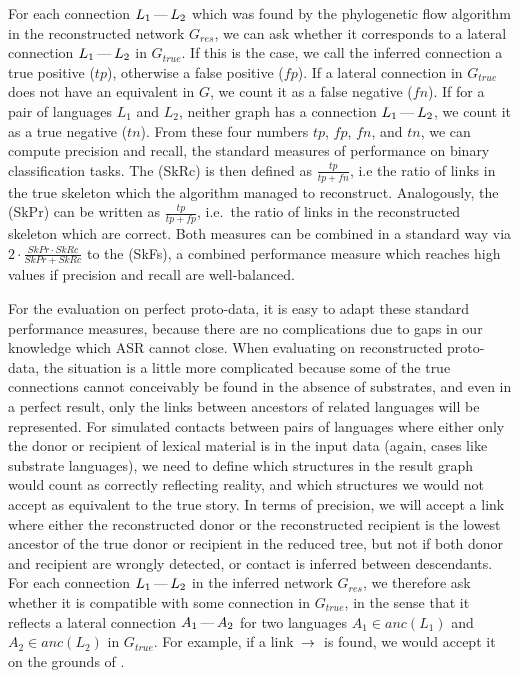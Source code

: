 For each connection $L_1 \kern 2pt\hbox{---}\kern 2pt L_2$ which was found by the phylogenetic flow algorithm in the reconstructed network $G_{res}$, we can ask whether it corresponds to a lateral connection $L_1 \kern 2pt\hbox{---}\kern 2pt L_2$ in $G_{true}$. If this is the case, we call the inferred connection a true positive ($tp$), otherwise a false positive ($fp$). If a lateral connection in $G_{true}$ does not have an equivalent in $G$, we count it as a false negative ($fn$). If for a pair of languages $L_1$ and $L_2$, neither graph has a connection $L_1 \kern 2pt\hbox{---}\kern 2pt L_2$, we count it as a true negative ($tn$). From these four numbers $tp$, $fp$, $fn$, and $tn$, we can compute precision and recall, the standard measures of performance on binary classification tasks. The \textit{} (SkRc) is then defined as $\frac{tp}{tp+fn}$, i.e the ratio of links in the true skeleton which the algorithm managed to reconstruct. Analogously, the \textit{} (SkPr) can be written as $\frac{tp}{tp+fp}$, i.e.\ the ratio of 
links in the reconstructed skeleton which are correct. Both measures can be combined in a standard way via $2 \cdot \frac{SkPr \cdot SkRc}{SkPr+SkRc}$ to the \textit{} (SkFs), a combined performance measure which reaches high values if precision and recall are well-balanced.

For the evaluation on perfect proto-data, it is easy to adapt these standard performance measures, because there are no complications due to gaps in our knowledge which ASR cannot close. When evaluating on reconstructed proto-data, the situation is a little more complicated because some of the true connections cannot conceivably be found in the absence of substrates, and even in a perfect result, only the links between ancestors of related languages will be represented. For simulated contacts between pairs of languages where either only the donor or recipient of lexical material is in the input data (again, cases like substrate languages), we need to define which structures in the result graph would count as correctly reflecting reality, and which structures we would not accept as equivalent to the true story. In terms of precision, we will accept a link where either the reconstructed donor or the reconstructed recipient is the lowest ancestor of the true donor or recipient in the reduced tree, but not if 
both donor and recipient are wrongly detected, or contact is inferred between descendants. For each connection $L_1 \kern 2pt\hbox{---}\kern 2pt L_2$ in the inferred network $G_{res}$, we therefore ask whether it is compatible with some connection in $G_{true}$, in the sense that it reflects a lateral connection $A_1 \kern 2pt\hbox{---}\kern 2pt A_2$ for two languages $A_1 \in anc(L_1)$ and $A_2 \in anc(L_2)$ in $G_{true}$. For example, if a link  $\kern 2pt\hbox{$\rightarrow$}\kern 2pt$  is found, we would accept it on the grounds of  \arrowLA {}.

